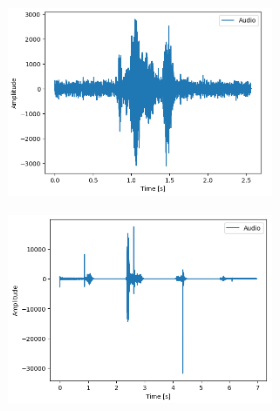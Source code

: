 \documentclass[11pt]{article}
\begin{document}
\begin{figure}
\begin{subfigure}{.5\textwidth}
\begin{subfigure}{.18\textwidth}
  \centering
  \includegraphics[width=\linewidth]{"Bilder/seminat_neutral.png"}
  \label{fig:sfig1}
\end{subfigure}%
\begin{subfigure}{.18\textwidth}
  \centering
  \includegraphics[width=\linewidth]{Bilder/seminat_angry.png}
  \label{fig:sfig2}
\end{subfigure}
\begin{subfigure}{.18\textwidth}
  \centering

\end{subfigure}
\end{subfigure}
\end{figure}
\end{document}
